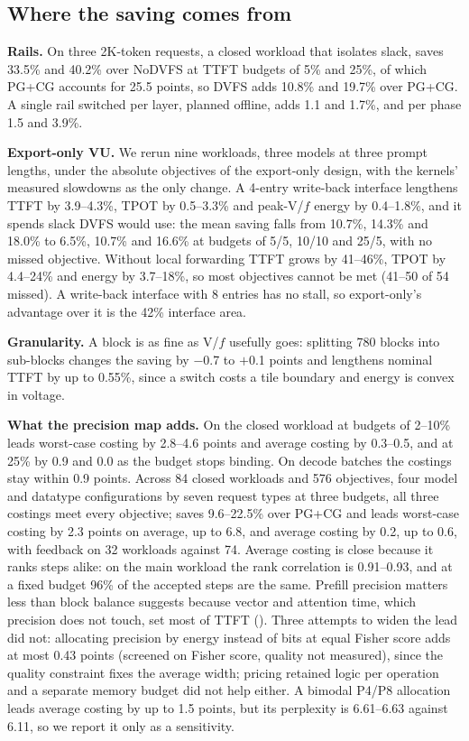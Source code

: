 \subsection{Where the saving comes from}
\textbf{Rails.}
On three 2K-token requests, a closed workload that isolates slack, \sys{} saves 33.5\% and 40.2\% over NoDVFS at TTFT budgets of 5\% and 25\%, of which PG+CG accounts for 25.5 points, so DVFS adds 10.8\% and 19.7\% over PG+CG. A single rail switched per layer, planned offline, adds 1.1 and 1.7\%, and per phase 1.5 and 3.9\%.

\textbf{Export-only VU.}
We rerun nine workloads, three models at three prompt lengths, under the absolute objectives of the export-only design, with the kernels' measured slowdowns as the only change.
A 4-entry write-back interface lengthens TTFT by 3.9--4.3\%, TPOT by 0.5--3.3\% and peak-V/$f$ energy by 0.4--1.8\%, and it spends slack DVFS would use: the mean saving falls from 10.7\%, 14.3\% and 18.0\% to 6.5\%, 10.7\% and 16.6\% at budgets of 5/5, 10/10 and 25/5, with no missed objective.
Without local forwarding TTFT grows by 41--46\%, TPOT by 4.4--24\% and energy by 3.7--18\%, so most objectives cannot be met (41--50 of 54 missed).
A write-back interface with 8 entries has no stall, so export-only's advantage over it is the 42\% interface area.

\textbf{Granularity.}
A block is as fine as V/$f$ usefully goes: splitting 780 blocks into sub-blocks changes the saving by $-$0.7 to $+$0.1 points and lengthens nominal TTFT by up to 0.55\%, since a switch costs a tile boundary and energy is convex in voltage.

\textbf{What the precision map adds.}
On the closed workload at budgets of 2--10\% \sys{} leads worst-case costing by 2.8--4.6 points and average costing by 0.3--0.5, and at 25\% by 0.9 and 0.0 as the budget stops binding.
On decode batches the costings stay within 0.9 points.
Across 84 closed workloads and 576 objectives, four model and datatype configurations by seven request types at three budgets, all three costings meet every objective; \sys{} saves 9.6--22.5\% over PG+CG and leads worst-case costing by 2.3 points on average, up to 6.8, and average costing by 0.2, up to 0.6, with feedback on 32 workloads against 74.
Average costing is close because it ranks steps alike: on the main workload the rank correlation is 0.91--0.93, and at a fixed budget 96\% of the accepted steps are the same.
Prefill precision matters less than block balance suggests because vector and attention time, which precision does not touch, set most of TTFT ().
Three attempts to widen the lead did not: allocating precision by energy instead of bits at equal Fisher score adds at most 0.43 points (screened on Fisher score, quality not measured), since the quality constraint fixes the average width; pricing retained logic per operation and a separate memory budget did not help either.
A bimodal P4/P8 allocation leads average costing by up to 1.5 points, but its perplexity is 6.61--6.63 against 6.11, so we report it only as a sensitivity.

